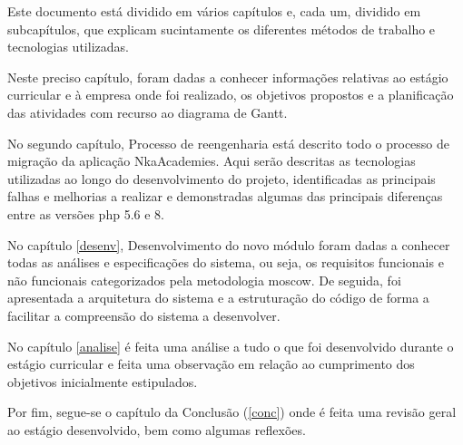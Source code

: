 Este documento está dividido em vários capítulos e, cada um, dividido em subcapítulos, que explicam sucintamente os diferentes métodos de trabalho e tecnologias utilizadas.

Neste preciso capítulo, foram dadas a conhecer informações relativas ao estágio curricular e à empresa onde foi realizado, os objetivos propostos e a planificação das atividades com recurso ao diagrama de Gantt.

No segundo capítulo, Processo de reengenharia está descrito todo o processo de migração da aplicação NkaAcademies. Aqui serão descritas as tecnologias utilizadas ao longo do desenvolvimento do projeto, identificadas as principais falhas e melhorias a realizar e demonstradas algumas das principais diferenças entre as versões \acrshort{php} 5.6 e 8.

No capítulo \ref{desenv}, Desenvolvimento do novo módulo foram dadas a conhecer todas as análises e especificações do sistema, ou seja, os requisitos funcionais e não funcionais categorizados pela metodologia \acrshort{moscow}. De seguida, foi apresentada a arquitetura do sistema e a estruturação do código de forma a facilitar a compreensão do sistema a desenvolver.

No capítulo \ref{analise} é feita uma análise a tudo o que foi desenvolvido durante o estágio curricular e feita uma observação em relação ao cumprimento dos objetivos inicialmente estipulados.

Por fim, segue-se o capítulo da Conclusão (\ref{conc}) onde é feita uma revisão geral ao estágio desenvolvido, bem como algumas reflexões.
